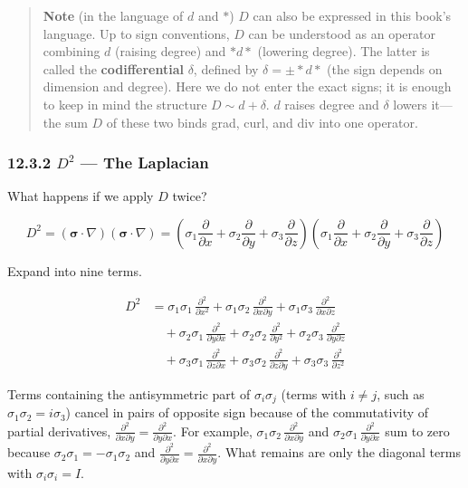 \documentclass[a4paper,12pt,openany]{book}
\begin{document}
\begin{quote}
\textbf{Note} (in the language of \(d\) and \(\ast\)) \(D\) can also be
expressed in this book's language. Up to sign conventions, \(D\) can be
understood as an operator combining \(d\) (raising degree) and
\(\ast d\ast\) (lowering degree). The latter is called the
\textbf{codifferential} \(\delta\), defined by
\(\delta = \pm\ast d\ast\) (the sign depends on dimension and degree).
Here we do not enter the exact signs; it is enough to keep in mind the
structure \(D \sim d + \delta\). \(d\) raises degree and \(\delta\)
lowers it—the sum \(D\) of these two binds grad, curl, and div into
one operator.
\end{quote}

\hypertarget{d2-the-laplacian}{%
\subsubsection{\texorpdfstring{12.3.2 \(D^2\) — The
Laplacian}{12.3.2 D\^{}2 — The Laplacian}}\label{d2-the-laplacian}}

What happens if we apply \(D\) twice?

\[D^2 = (\bm{\sigma}\!\cdot\!\nabla)(\bm{\sigma}\!\cdot\!\nabla) = (\sigma_1\frac{\partial}{\partial x} + \sigma_2\frac{\partial}{\partial y} + \sigma_3\frac{\partial}{\partial z})(\sigma_1\frac{\partial}{\partial x} + \sigma_2\frac{\partial}{\partial y} + \sigma_3\frac{\partial}{\partial z})\]

Expand into nine terms.

\[
\begin{aligned}
D^2 &= \sigma_1\sigma_1\,\frac{\partial^2}{\partial x^2} + \sigma_1\sigma_2\,\frac{\partial^2}{\partial x\partial y} + \sigma_1\sigma_3\,\frac{\partial^2}{\partial x\partial z} \\
&\quad + \sigma_2\sigma_1\,\frac{\partial^2}{\partial y\partial x} + \sigma_2\sigma_2\,\frac{\partial^2}{\partial y^2} + \sigma_2\sigma_3\,\frac{\partial^2}{\partial y\partial z} \\
&\quad + \sigma_3\sigma_1\,\frac{\partial^2}{\partial z\partial x} + \sigma_3\sigma_2\,\frac{\partial^2}{\partial z\partial y} + \sigma_3\sigma_3\,\frac{\partial^2}{\partial z^2}
\end{aligned}
\]

Terms containing the antisymmetric part of \(\sigma_i\sigma_j\) (terms
with \(i\neq j\), such as \(\sigma_1\sigma_2 = i\sigma_3\)) cancel in
pairs of opposite sign because of the commutativity of partial
derivatives,
\(\frac{\partial^2}{\partial x\partial y} = \frac{\partial^2}{\partial y\partial x}\).
For example,
\(\sigma_1\sigma_2\,\frac{\partial^2}{\partial x\partial y}\) and
\(\sigma_2\sigma_1\,\frac{\partial^2}{\partial y\partial x}\) sum to
zero because \(\sigma_2\sigma_1 = -\sigma_1\sigma_2\) and
\(\frac{\partial^2}{\partial y\partial x} = \frac{\partial^2}{\partial x\partial y}\).
What remains are only the diagonal terms with \(\sigma_i\sigma_i = I\).
\end{document}
